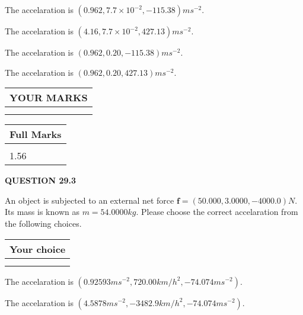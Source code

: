 \documentclass[12pt]{article}
\begin{document}
 
The accelaration is $  %
(
0.962,
7.7 \times 10^{-2},
-115.38)
ms^{-2} $.
 
 
The accelaration is $  %
(
4.16,
7.7 \times 10^{-2},
427.13)
ms^{-2} $.
 
 
The accelaration is $  %
(
0.962,
0.20,
-115.38)
ms^{-2} $.
 
 
The accelaration is $  %
(
0.962,
0.20,
427.13)
ms^{-2} $.
 
 
 

 

 
\vspace{0.3in}
  
\vspace{0.2in}
  
\noindent\begin{tabular}{|l|}
\hline
 YOUR MARKS  \\
\hline
 \\ 
 \\ 
\hline
\end{tabular}
\hspace{0.05in} \begin{tabular}{|l|}
\hline
 Full Marks  \\
\hline
 \\ 
1.56 \\
\hline
\end{tabular}
{\textbf{\Large{QUESTION
29.3 
}}}
  
  
 
An object is subjected to an external net force $\mathbf{f}=(
50.000 ,
3.0000,
-4000.0  )N$. Its mass is known as
$m= %
54.0000  kg$. Please choose the correct accelaration
from the following choices.
 
  
  
\noindent\hspace{3.0in} \begin{tabular}{|l|}
\hline
Your choice \\
\hline
 \\ 
 \\ 
\hline
\end{tabular}
  
  
 
 
The accelaration is
$(
0.92593ms^{-2},
720.00km/h^2,
-74.074ms^{-2}
).
$
 
 
The accelaration is
$(
4.5878ms^{-2},
-3482.9km/h^2,
-74.074ms^{-2}
).
$
 
\end{document}

